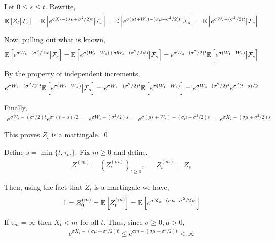 \documentclass[10pt]{article}
\begin{document}
\begin{solution}[Solution]
Let \( 0\leq s\leq t \). Rewrite,
\begin{align*}
    \mathbb{E} \left[ Z_t \big| \mathcal{F}_s \right]
    = \mathbb{E} \left[ e^{\sigma X_t - (\sigma \mu+\sigma^2/2)t } \big|\mathcal{F}_s \right]
    = \mathbb{E} \left[ e^{\sigma (\mu t+W_t) - (\sigma \mu+\sigma^2/2)t } \big|\mathcal{F}_s \right]
    = \mathbb{E} \left[ e^{\sigma W_t - (\sigma^2/2)t } \big|\mathcal{F}_s \right]
\end{align*}

Now, pulling out what is known,
\begin{align*}
    \mathbb{E} \left[ e^{\sigma W_t - (\sigma^2/2)t } \big|\mathcal{F}_s \right]
    = \mathbb{E} \left[ e^{\sigma (W_t-W_s) + \sigma W_s-(\sigma^2/2)t)} \big|\mathcal{F}_s \right]
    = e^{\sigma W_s - (\sigma^2/2)t} \mathbb{E} \left[ e^{\sigma (W_t-W_s)} \big|\mathcal{F}_s \right]
\end{align*}

By the property of independent increments,
\begin{align*}
    e^{\sigma W_s - (\sigma^2/2)t} \mathbb{E} \left[ e^{\sigma (W_t-W_s)} \big|\mathcal{F}_s \right]
    = e^{\sigma W_s - (\sigma^2/2)t} \mathbb{E} \left[ e^{\sigma (W_t-W_s)} \right]
    = e^{\sigma W_s - (\sigma^2/2)t} e^{\sigma^2(t-s)/2}
\end{align*}

Finally,
\begin{align*}
    e^{\sigma W_s - (\sigma^2/2)t} e^{\sigma^2(t-s)/2}
    =e^{\sigma W_s - (\sigma^2/2)s}
    =e^{\sigma (\mu s+W_s) - (\sigma\mu  +\sigma^2/2)s}
    =e^{\sigma X_2 - (\sigma\mu  +\sigma^2/2)s}
\end{align*}

This proves \( Z_t \) is a martingale. \qed


Define \( s=\min\{t,\tau_m\} \). Fix \( m\geq 0 \) and define,
\begin{align*}
    Z^{(m)} = \left( Z_t^{(m)} \right)_{t\geq 0}, && Z_t^{(m)} = Z_s
\end{align*}

Then, using the fact that \( Z_t \) is a martingale we have,
\begin{align*}
    1 = Z_0^{(m)} = \mathbb{E} \left[ Z_t^{(m)} \right]
    = \mathbb{E} \left[ e^{\sigma X_s - (\sigma \mu+\sigma^2/2) s} \right]
\end{align*}

If \( \tau_m = \infty \) then \( X_{t} < m \) for all \( t \). Thus, since \( \sigma\geq0, \mu>0 \), 
\begin{align*}
    e^{\sigma X_t - (\sigma\mu+\sigma^2/2)t} \leq  
    e^{\sigma m - (\sigma\mu+\sigma^2/2)t} < \infty
\end{align*}


\end{solution}
\end{document}

